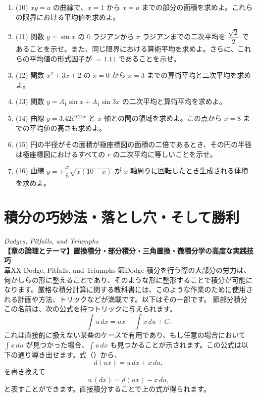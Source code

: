 \documentclass[a4paper,11pt,openany]{ltjsbook}
\begin{document}
\begin{enumerate}
\item{(10)} $xy=a$ の曲線で、$x=1$ から $x = a$ までの部分の面積を求めよ。これらの限界における平均値を求めよ。

\item{(11)} 関数 $y=\sin x$ の $0$ ラジアンから $\pi$ ラジアンまでの二次平均を $\dfrac{\sqrt{2}}{2}$ であることを示せ。また、同じ限界における算術平均を求めよ。さらに、これらの平均値の形式因子が $=1.11$ であることを示せ。

\item{(12)} 関数 $x^2+3x+2$ の $x=0$ から $x=3$ までの算術平均と二次平均を求めよ。

\item{(13)} 関数 $y=A_1 \sin x + A_1 \sin 3x$ の二次平均と算術平均を求めよ。

\item{(14)} 曲線 $y=3.42\epsilon^{0.21x}$ と $x$ 軸との間の領域を求めよ。この点から $x=8$ までの平均値の高さも求めよ。

\item{(15)} 円の半径がその面積が極座標図の面積の二倍であるとき、その円の半径は極座標図におけるすべての $r$ の二次平均に等しいことを示せ。

\item{(16)} 曲線 $y=±\dfrac{x}{6}\sqrt{x(10-x)}$ が $x$ 軸周りに回転したとき生成される体積を求めよ。
\end{enumerate}



\chapter{積分の巧妙法・落とし穴・そして勝利}
\noindent\textit{\large Dodges, Pitfalls, and Triumphs}\\[2mm]
\noindent\textbf{\small 【章の論理とテーマ】置換積分・部分積分・三角置換・微積分学の高度な実践技巧}\\[4mm]
章{XX}{ Dodge, Pitfalls, and Triumphs}
節{Dodge}
積分を行う際の大部分の労力は、何かしらの形に整えることであり、そのような形に整形することで積分が可能になります。厳格な積分計算に関する教科書には、このような作業のために使用される計画や方法、トリックなどが満載です。以下はその一部です。
節{部分積分}
この名前は、次の公式を持つトリックに与えられます。
\[
\int u \, dx = ux - \int x \, du + C.
\]
これは直接的に扱えない某些のケースで有用であり、もし任意の場合において $\displaystyle \int x \, du$ が見つかった場合、$\displaystyle \int u \, dx$ も見つかることが示されます。この公式は以下の通り導き出せます。式（\pageref{differprod}）から、
\[
d(ux) = u \, dx + x \, du,
\]
を書き換えて
\[
u \, (dx) = d(ux) - x \, du,
\]
と表すことができます。直接積分することで上の式が得られます。
\end{document}
